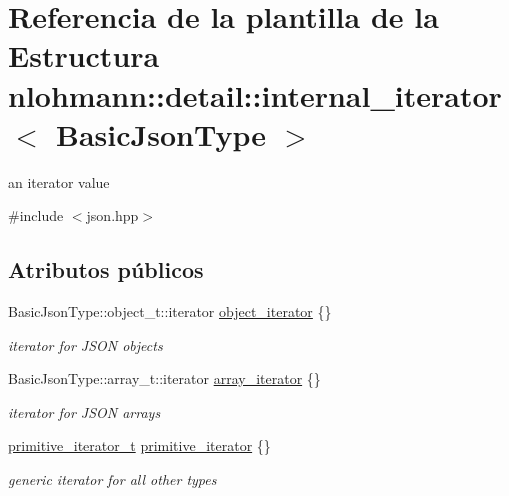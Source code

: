 \hypertarget{structnlohmann_1_1detail_1_1internal__iterator}{}\section{Referencia de la plantilla de la Estructura nlohmann\+:\+:detail\+:\+:internal\+\_\+iterator$<$ Basic\+Json\+Type $>$}
\label{structnlohmann_1_1detail_1_1internal__iterator}


an iterator value  




{\ttfamily \#include $<$json.\+hpp$>$}

\subsection*{Atributos públicos}
\begin{DoxyCompactItemize}
\item 
\mbox{\label{structnlohmann_1_1detail_1_1internal__iterator_a8cb0af3498061426c1d0a65ad6220408}} 
Basic\+Json\+Type\+::object\+\_\+t\+::iterator \mbox{\hyperlink{structnlohmann_1_1detail_1_1internal__iterator_a8cb0af3498061426c1d0a65ad6220408}{object\+\_\+iterator}} \{\}
\begin{DoxyCompactList}\small\item\em iterator for J\+S\+ON objects \end{DoxyCompactList}\item 
\mbox{\label{structnlohmann_1_1detail_1_1internal__iterator_a8294a6e6f01b58e1cce8fbae66a50b5d}} 
Basic\+Json\+Type\+::array\+\_\+t\+::iterator \mbox{\hyperlink{structnlohmann_1_1detail_1_1internal__iterator_a8294a6e6f01b58e1cce8fbae66a50b5d}{array\+\_\+iterator}} \{\}
\begin{DoxyCompactList}\small\item\em iterator for J\+S\+ON arrays \end{DoxyCompactList}\item 
\mbox{\label{structnlohmann_1_1detail_1_1internal__iterator_a2b3bb45f968210e42c282017eeeb63a8}} 
\mbox{\hyperlink{classnlohmann_1_1detail_1_1primitive__iterator__t}{primitive\+\_\+iterator\+\_\+t}} \mbox{\hyperlink{structnlohmann_1_1detail_1_1internal__iterator_a2b3bb45f968210e42c282017eeeb63a8}{primitive\+\_\+iterator}} \{\}
\begin{DoxyCompactList}\small\item\em generic iterator for all other types \end{DoxyCompactList}\end{DoxyCompactItemize}


